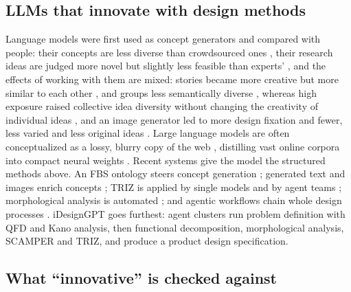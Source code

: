 \subsection{LLMs that innovate with design methods}

Language models were first used as concept generators \citep{Zhu2022,Ma2023} and compared with people: their concepts are less diverse than crowdsourced ones \citep{Ma2025}, their research ideas are judged more novel but slightly less feasible than experts' \citep{Si2024}, and the effects of working with them are mixed: stories became more creative but more similar to each other \citep{Doshi2024}, and groups less semantically diverse \citep{Anderson2024}, whereas high exposure raised collective idea diversity without changing the creativity of individual ideas \citep{Ashkinaze2025}, and an image generator led to more design fixation and fewer, less varied and less original ideas \citep{Wadinambiarachchi2024}. Large language models are often conceptualized as a lossy, blurry copy of the web \citep{Chiang2023}, distilling vast online corpora into compact neural weights \citep{Karpathy2023}. Recent systems give the model the structured methods above. An FBS ontology steers concept generation \citep{Chen2024a}; generated text and images enrich concepts \citep{Chen2024}; TRIZ is applied by single models and by agent teams \citep{Chen2024c,Jiang2025,Szczepanik2025}; morphological analysis is automated \citep{Chen2024b}; and agentic workflows chain whole design processes \citep{Ding2023,Massoudi2026}. iDesignGPT \citep{Liu2026} goes furthest: agent clusters run problem definition with QFD and Kano analysis, then functional decomposition, morphological analysis, SCAMPER \citep{Eberle1971} and TRIZ, and produce a product design specification.

\subsection{What ``innovative'' is checked against}\label{what-innovative-is-checked-against}

